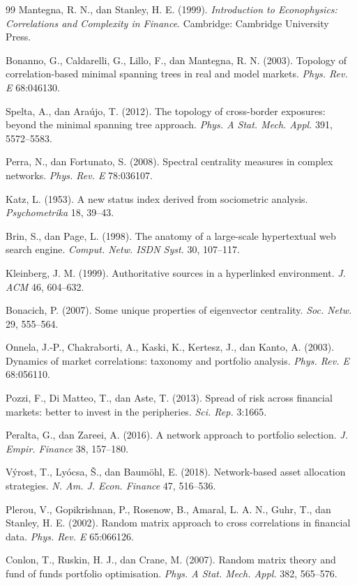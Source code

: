 \documentclass[12pt,a4paper]{article}
\begin{document}
\begin{thebibliography}{99}
 Mantegna, R. N., dan Stanley, H. E. (1999). \textit{Introduction to Econophysics: Correlations and Complexity in Finance}. Cambridge: Cambridge University Press.

 Bonanno, G., Caldarelli, G., Lillo, F., dan Mantegna, R. N. (2003). Topology of correlation-based minimal spanning trees in real and model markets. \textit{Phys. Rev. E} 68:046130.

 Spelta, A., dan Araújo, T. (2012). The topology of cross-border exposures: beyond the minimal spanning tree approach. \textit{Phys. A Stat. Mech. Appl.} 391, 5572–5583.

 Perra, N., dan Fortunato, S. (2008). Spectral centrality measures in complex networks. \textit{Phys. Rev. E} 78:036107.

 Katz, L. (1953). A new status index derived from sociometric analysis. \textit{Psychometrika} 18, 39–43.

 Brin, S., dan Page, L. (1998). The anatomy of a large-scale hypertextual web search engine. \textit{Comput. Netw. ISDN Syst.} 30, 107–117.

 Kleinberg, J. M. (1999). Authoritative sources in a hyperlinked environment. \textit{J. ACM} 46, 604–632.

 Bonacich, P. (2007). Some unique properties of eigenvector centrality. \textit{Soc. Netw.} 29, 555–564.

 Onnela, J.-P., Chakraborti, A., Kaski, K., Kertesz, J., dan Kanto, A. (2003). Dynamics of market correlations: taxonomy and portfolio analysis. \textit{Phys. Rev. E} 68:056110.

 Pozzi, F., Di Matteo, T., dan Aste, T. (2013). Spread of risk across financial markets: better to invest in the peripheries. \textit{Sci. Rep.} 3:1665.

 Peralta, G., dan Zareei, A. (2016). A network approach to portfolio selection. \textit{J. Empir. Finance} 38, 157–180.

 Výrost, T., Lyócsa, Š., dan Baumöhl, E. (2018). Network-based asset allocation strategies. \textit{N. Am. J. Econ. Finance} 47, 516–536.

 Plerou, V., Gopikrishnan, P., Rosenow, B., Amaral, L. A. N., Guhr, T., dan Stanley, H. E. (2002). Random matrix approach to cross correlations in financial data. \textit{Phys. Rev. E} 65:066126.

 Conlon, T., Ruskin, H. J., dan Crane, M. (2007). Random matrix theory and fund of funds portfolio optimisation. \textit{Phys. A Stat. Mech. Appl.} 382, 565–576.

\end{thebibliography}
\end{document}
